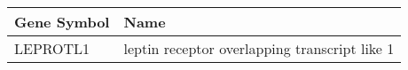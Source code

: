 \begin{tabular}{ll}
\toprule
Gene Symbol &                                          Name \\
\midrule
   LEPROTL1 & leptin receptor overlapping transcript like 1 \\
\bottomrule
\end{tabular}
